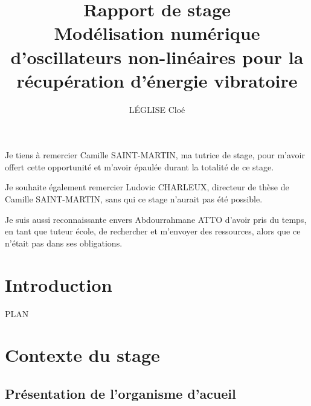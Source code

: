\documentclass[a4paper, french, 12pt, titlepage]{article}
\title{Rapport de stage \\ Modélisation numérique d’oscillateurs non-linéaires pour
la récupération d’énergie vibratoire}
\author{LÉGLISE Cloé}
\begin{document}
\maketitle

\begin{center}
Je tiens à remercier Camille SAINT-MARTIN, ma tutrice de stage, pour m'avoir offert cette opportunité et m'avoir épaulée durant la totalité de ce stage.  \\
\end{center}

\begin{center}
Je souhaite également remercier Ludovic CHARLEUX, directeur de thèse de Camille SAINT-MARTIN, sans qui ce stage n'aurait pas été possible. \\
\end{center}

\begin{center}
Je suis aussi reconnaissante envers Abdourrahmane ATTO d'avoir pris du temps, en tant que tuteur école, de rechercher et m'envoyer des ressources, alors que ce n'était pas dans ses obligations. 
\end{center}

\newpage 

\tableofcontents

\newpage

\section*{Introduction}



PLAN 

\newpage 

\section{Contexte du stage}

\subsection{Présentation de l'organisme d'acueil}
\end{document}
